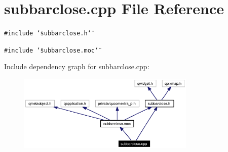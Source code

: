 \section{subbarclose.cpp File Reference}
\label{subbarclose_8cpp}


{\tt \#include \char`\"{}subbarclose.h\char`\"{}}\par
{\tt \#include \char`\"{}subbarclose.moc\char`\"{}}\par


Include dependency graph for subbarclose.cpp:\begin{figure}[H]
\begin{center}
\leavevmode
\includegraphics[width=239pt]{subbarclose_8cpp__incl}
\end{center}
\end{figure}
